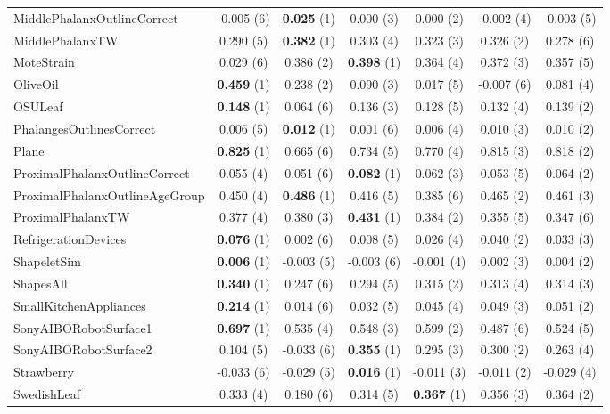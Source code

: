 \begin{table}[ht]
\begin{adjustbox}{width=\textwidth}
\begin{tabular}{lcccccc}
    MiddlePhalanxOutlineCorrect & -0.005 (6) & \textbf{0.025} (1) & 0.000 (3) & 0.000 (2) & -0.002 (4) & -0.003 (5) \\
    MiddlePhalanxTW & 0.290 (5) & \textbf{0.382} (1) & 0.303 (4) & 0.323 (3) & 0.326 (2) & 0.278 (6) \\
    MoteStrain & 0.029 (6) & 0.386 (2) & \textbf{0.398} (1) & 0.364 (4) & 0.372 (3) & 0.357 (5) \\
    OliveOil & \textbf{0.459} (1) & 0.238 (2) & 0.090 (3) & 0.017 (5) & -0.007 (6) & 0.081 (4) \\
    OSULeaf & \textbf{0.148} (1) & 0.064 (6) & 0.136 (3) & 0.128 (5) & 0.132 (4) & 0.139 (2) \\
    PhalangesOutlinesCorrect & 0.006 (5) & \textbf{0.012} (1) & 0.001 (6) & 0.006 (4) & 0.010 (3) & 0.010 (2) \\
    Plane & \textbf{0.825} (1) & 0.665 (6) & 0.734 (5) & 0.770 (4) & 0.815 (3) & 0.818 (2) \\
    ProximalPhalanxOutlineCorrect & 0.055 (4) & 0.051 (6) & \textbf{0.082} (1) & 0.062 (3) & 0.053 (5) & 0.064 (2) \\
    ProximalPhalanxOutlineAgeGroup & 0.450 (4) & \textbf{0.486} (1) & 0.416 (5) & 0.385 (6) & 0.465 (2) & 0.461 (3) \\
    ProximalPhalanxTW & 0.377 (4) & 0.380 (3) & \textbf{0.431} (1) & 0.384 (2) & 0.355 (5) & 0.347 (6) \\
    RefrigerationDevices & \textbf{0.076} (1) & 0.002 (6) & 0.008 (5) & 0.026 (4) & 0.040 (2) & 0.033 (3) \\
    ShapeletSim & \textbf{0.006} (1) & -0.003 (5) & -0.003 (6) & -0.001 (4) & 0.002 (3) & 0.004 (2) \\
    ShapesAll & \textbf{0.340} (1) & 0.247 (6) & 0.294 (5) & 0.315 (2) & 0.313 (4) & 0.314 (3) \\
    SmallKitchenAppliances & \textbf{0.214} (1) & 0.014 (6) & 0.032 (5) & 0.045 (4) & 0.049 (3) & 0.051 (2) \\
    SonyAIBORobotSurface1 & \textbf{0.697} (1) & 0.535 (4) & 0.548 (3) & 0.599 (2) & 0.487 (6) & 0.524 (5) \\
    SonyAIBORobotSurface2 & 0.104 (5) & -0.033 (6) & \textbf{0.355} (1) & 0.295 (3) & 0.300 (2) & 0.263 (4) \\
    Strawberry & -0.033 (6) & -0.029 (5) & \textbf{0.016} (1) & -0.011 (3) & -0.011 (2) & -0.029 (4) \\
    SwedishLeaf & 0.333 (4) & 0.180 (6) & 0.314 (5) & \textbf{0.367} (1) & 0.356 (3) & 0.364 (2) \\

\end{tabular}
\end{adjustbox}
\end{table}
